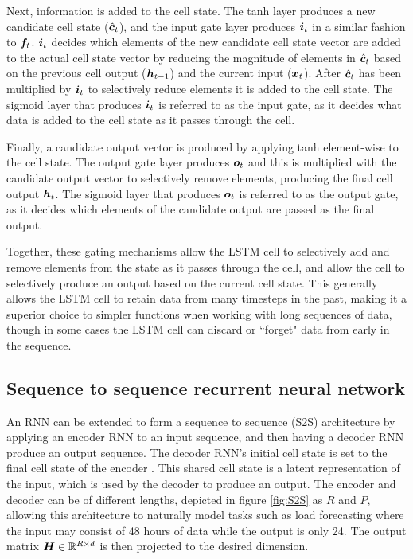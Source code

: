 Next, information is added to the cell state.
The tanh layer produces a new candidate cell state ($\hat{{\bm{c}}}_t$), and the input gate layer produces ${\bm{i}}_t$ in a similar fashion to ${\bm{f}}_t$.
${\bm{i}}_t$ decides which elements of the new candidate cell state vector are added to the actual cell state vector by reducing the magnitude of elements in $\hat{{\bm{c}}}_t$ based on the previous cell output (${\bm{h}}_{t-1}$) and the current input (${\bm{x}}_t$).
After $\hat{{\bm{c}}}_t$ has been multiplied by ${\bm{i}}_t$ to selectively reduce elements it is added to the cell state.
The sigmoid layer that produces ${\bm{i}}_t$ is referred to as the input gate, as it decides what data is added to the cell state as it passes through the cell.

Finally, a candidate output vector is produced by applying tanh element-wise to the cell state.
The output gate layer produces ${\bm{o}}_t$ and this is multiplied with the candidate output vector to selectively remove elements, producing the final cell output ${\bm{h}}_t$.
The sigmoid layer that produces ${\bm{o}}_t$ is referred to as the output gate, as it decides which elements of the candidate output are passed as the final output.

Together, these gating mechanisms allow the LSTM cell to selectively add and remove elements from the state as it passes through the cell, and allow the cell to selectively produce an output based on the current cell state.
This generally allows the LSTM cell to retain data from many timesteps in the past, making it a superior choice to simpler functions when working with long sequences of data, though in some cases the LSTM cell can discard or ``forget" data from early in the sequence.

\subsection{Sequence to sequence recurrent neural network}
\label{section-S2S}
An RNN can be extended to form a sequence to sequence (S2S) architecture by applying an encoder RNN to an input sequence, and then having a decoder RNN produce an output sequence.
The decoder RNN's initial cell state is set to the final cell state of the encoder \cite{Cho2014a}.
This shared cell state is a latent representation of the input, which is used by the decoder to produce an output.
The encoder and decoder can be of different lengths, depicted in figure \ref{fig:S2S} as $R$ and $P$, allowing this architecture to naturally model tasks such as load forecasting where the input may consist of 48 hours of data while the output is only 24.
The output matrix ${\bm{H}} \in \mathbb{R}^{R \times d}$ is then projected to the desired dimension.

